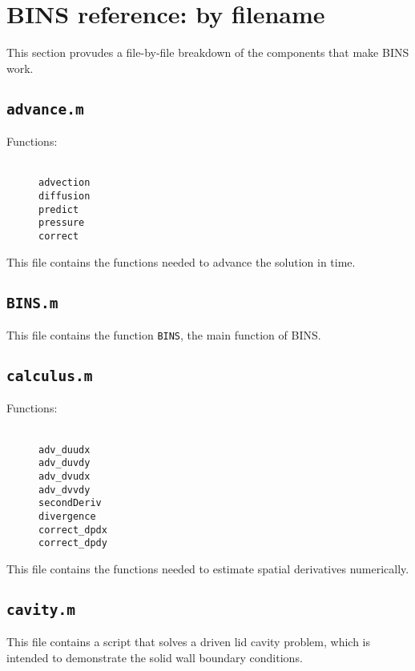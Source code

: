 \documentclass[12pt]{article}
\begin{document}
\section{BINS reference: by filename}
This section provudes a file-by-file breakdown of the components that make BINS work.

\subsection{\texttt{advance.m}}
\begin{description}
\item[Functions:] \hfill \\ \texttt{advection} \\ \texttt{diffusion} \\ \texttt{predict} \\  \texttt{pressure} \\  \texttt{correct}
\end{description}
This file contains the functions needed to advance the solution in time.

\subsection{\texttt{BINS.m}}
This file contains the function \texttt{BINS}, the main function of BINS.

\subsection{\texttt{calculus.m}}
\begin{description}
\item[Functions:] \hfill \\ \texttt{adv\_duudx} \\ \texttt{adv\_duvdy} \\ \texttt{adv\_dvudx} \\  \texttt{adv\_dvvdy}  \\ \texttt{secondDeriv} \\ \texttt{divergence} \\ \texttt{correct\_dpdx} \\ \texttt{correct\_dpdy}
\end{description}
This file contains the functions needed to estimate spatial derivatives numerically.

\subsection{\texttt{cavity.m}}
This file contains a script that solves a driven lid cavity problem, which is intended to demonstrate the solid wall boundary conditions.
\end{document}
